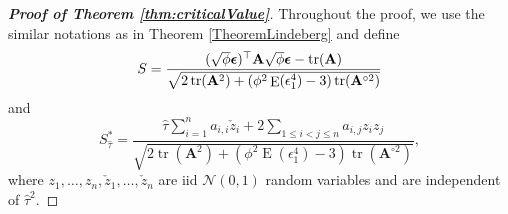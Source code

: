 \documentclass[smallextended]{svjour3}       %
\DeclareMathOperator{\mytr}{tr}
\DeclareMathOperator{\myE}{E}
\newcommand{\BA}{\mathbf{A}}    \newcommand{\BB}{\mathbf{B}}    \newcommand{\BC}{\mathbf{C}}    \newcommand{\BD}{\mathbf{D}}    \newcommand{\BE}{\mathbf{E}}    \newcommand{\BF}{\mathbf{F}}    \newcommand{\BG}{\mathbf{G}}    \newcommand{\BH}{\mathbf{H}}    \newcommand{\BI}{\mathbf{I}}    \newcommand{\BJ}{\mathbf{J}}    \newcommand{\BK}{\mathbf{K}}    \newcommand{\BL}{\mathbf{L}}
\begin{document}
\begin{proof}[\textbf{Proof of Theorem \ref{thm:criticalValue}}]
    Throughout the proof, we use the similar notations as in Theorem \ref{TheoremLindeberg} and define
    \begin{equation*}
        S=\frac{
            (\sqrt \phi \bepsilon)^\top \BA \sqrt \phi \bepsilon - \mytr (\BA)
        }{
            \sqrt{
    2 \mytr(\BA^2)
    +
    (\phi^2\myE (\epsilon_1^4)-3) \mytr(\BA^{\circ 2})
            }             
        }
    \end{equation*}
    and
    \begin{equation*}
        S_{ \hat \tau}^* =
        \frac{
            \hat \tau \sum_{i=1}^n  a_{i,i}\check z_i
        +2\sum_{1\leq i <j \leq n} a_{i,j} z_i z_j
    }
    {
            \sqrt{
    2 \mytr(\BA^2)
    +
    (\phi^2\myE (\epsilon_1^4)-3) \mytr(\BA^{\circ 2})
            }             
        },
    \end{equation*}
    where $z_1,\ldots, z_n, \check z_1,\ldots, \check z_n$ are iid $\mathcal N(0,1)$ random variables and are independent of $\hat \tau^2$.



\end{proof}
\end{document}
